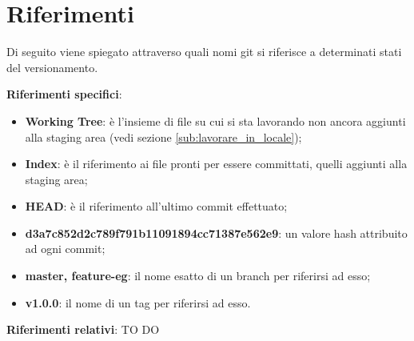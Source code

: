 
\newpage \clearpage
\section{Riferimenti} %
\label{sec:riferimenti}
Di seguito viene spiegato attraverso quali nomi git si riferisce a determinati stati del versionamento. \newline \newline

\textbf{Riferimenti specifici}:
	\begin{itemize}
		\item \textbf{Working Tree}: è l'insieme di file su cui si sta lavorando non ancora aggiunti alla staging area (vedi sezione \ref{sub:lavorare_in_locale});
		\item \textbf{Index}: è il riferimento ai file pronti per essere committati, quelli aggiunti alla staging area;
		\item \textbf{HEAD}: è il riferimento all'ultimo commit effettuato;
		\item \textbf{d3a7c852d2c789f791b11091894cc71387e562e9}: un valore hash attribuito ad ogni commit;
		\item \textbf{master, feature-eg}: il nome esatto di un branch per riferirsi ad esso;
		\item \textbf{v1.0.0}: il nome di un tag per riferirsi ad esso.
	\end{itemize}
	\noindent
\textbf{Riferimenti relativi}: TO DO

\newpage \clearpage

